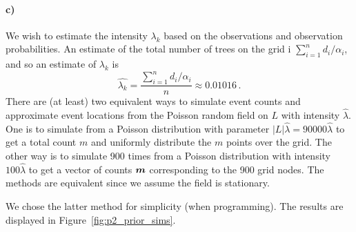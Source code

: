 \paragraph{c)}
We wish to estimate the intensity $\lambda_k$ based on the observations and observation probabilities. An estimate of the total number of trees on the grid i $\sum_{i=1}^n d_i / \alpha_i$, and so an estimate of $\lambda_k$ is
%
\begin{equation*}
    \hat{\lambda_k} = \frac{\sum_{i=1}^n d_i / \alpha_i}{n} \approx 0.01016 \, .
\end{equation*}
%
There are (at least) two equivalent ways to simulate event counts and approximate event locations from the Poisson random field on $L$ with intensity $\hat{\lambda}$. One is to simulate from a Poisson distribution with parameter $|L|\hat{\lambda} = 90000\hat{\lambda}$ to get a total count $m$ and uniformly distribute the $m$ points over the grid. The other way is to simulate 900 times from a Poisson distribution with intensity $100\hat{\lambda}$ to get a vector of counts $\bm{m}$ corresponding to the 900 grid nodes. The methods are equivalent since we assume the field is stationary.

We chose the latter method for simplicity (when programming). The results are displayed in Figure~\ref{fig:p2_prior_sims}.

